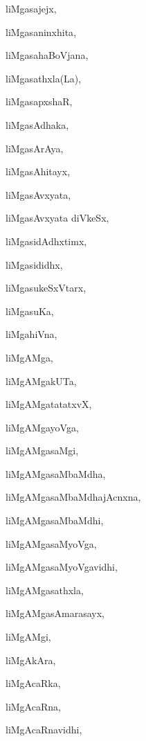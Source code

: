 \begin{multicols}{2}
{liMgasajejx}, \pageref{liMgasajejx}

{liMgasaninxhita}, \pageref{liMgasaninxhita}

{liMgasahaBoVjana}, \pageref{liMgasahaBoVjana}

{liMgasathxla(La)}, \pageref{liMgasathxla(La)}

{liMgasapxshaR}, \pageref{liMgasapxshaR}

{liMgasAdhaka}, \pageref{liMgasAdhaka}

{liMgasArAya}, \pageref{liMgasArAya}

{liMgasAhitayx}, \pageref{liMgasAhitayx}

{liMgasAvxyata}, \pageref{liMgasAvxyata}

{liMgasAvxyata diVkeSx}, \pageref{liMgasAvxyatadiVkeSx}

{liMgasidAdhxtimx}, \pageref{liMgasidAdhxtimx}

{liMgasididhx}, \pageref{liMgasididhx}

{liMgasukeSxVtarx}, \pageref{liMgasukeSxVtarx}

{liMgasuKa}, \pageref{liMgasuKa}

{liMgahiVna}, \pageref{liMgahiVna}

{liMgAMga}, \pageref{liMgAMga}

{liMgAMgakUTa}, \pageref{liMgAMgakUTa}

{liMgAMgatatatxvX}, \pageref{liMgAMgatatatxvX}

{liMgAMgayoVga}, \pageref{liMgAMgayoVga}

{liMgAMgasaMgi}, \pageref{liMgAMgasaMgi}

{liMgAMgasaMbaMdha}, \pageref{liMgAMgasaMbaMdha}

{liMgAMgasaMbaMdhajAcnxna}, \pageref{liMgAMgasaMbaMdhajAcnxna}

{liMgAMgasaMbaMdhi}, \pageref{liMgAMgasaMbaMdhi}

{liMgAMgasaMyoVga}, \pageref{liMgAMgasaMyoVga}

{liMgAMgasaMyoVgavidhi}, \pageref{liMgAMgasaMyoVgavidhi}

{liMgAMgasathxla}, \pageref{liMgAMgasathxla}

{liMgAMgasAmarasayx}, \pageref{liMgAMgasAmarasayx}

{liMgAMgi}, \pageref{liMgAMgi}

{liMgAkAra}, \pageref{liMgAkAra}

{liMgAcaRka}, \pageref{liMgAcaRka}

{liMgAcaRna}, \pageref{liMgAcaRna}

{liMgAcaRnavidhi}, \pageref{liMgAcaRnavidhi}


\end{multicols}
